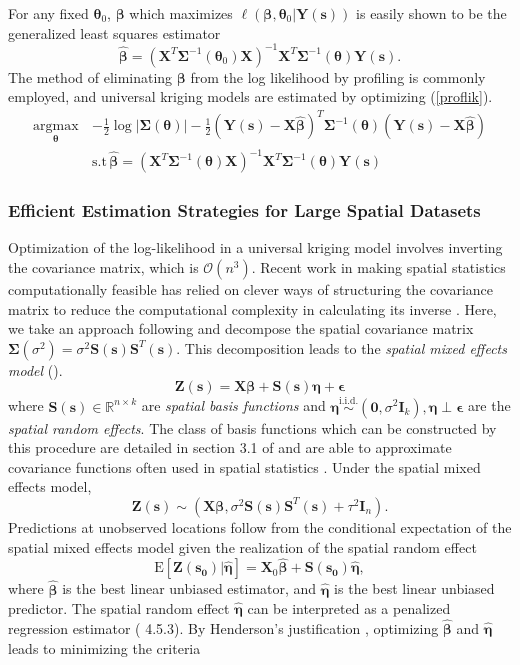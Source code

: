 \documentclass[12pt]{article}
\newcommand{\proc}{\mathbf{Y}(\mathbf{s})}
\newcommand{\covs}{\mathbf{X}}
\newcommand{\obs}{\mathbf{Z}(\mathbf{s})}
\newcommand{\nggt}{\boldsymbol{\epsilon}}
\newcommand{\eye}{\mathbf{I} }
\newcommand{\pars}{\boldsymbol{\theta}}
\newcommand{\Sig}{\boldsymbol{\Sigma}}
\newcommand{\re}{\boldsymbol{\eta}}
\newcommand{\estre}{\boldsymbol{\hat \eta}}
\newcommand{\spatbas}{\mathbf{S}(\mathbf{s})}
\newcommand{\tspatbas}{\mathbf{S}^T(\mathbf{s})}
\newcommand{\bbeta}{\boldsymbol{\beta}}
\begin{document}
For any fixed $\pars_0$, $ \bbeta$ which maximizes $\ell ( \bbeta,\pars_0 |\proc)$ is easily shown to be the generalized least squares estimator
$$ \boldsymbol {\hat \beta} = (\covs^T \Sig^{-1}(\pars_0) \covs )^{-1} \covs^T \Sig^{-1} (\pars) \proc.$$
The method of eliminating $\bbeta$ from the log likelihood by profiling is commonly employed, and universal kriging models are estimated by optimizing (\ref{proflik}). 
\begin{align}
\label{proflik}
\underset{ \pars}{\text{argmax} } \, &-\frac{1}{2} \log | \Sig(\pars) | - \frac{1}{2} (\proc - \covs \boldsymbol{ \hat \beta} )^T \Sig^{-1} (\pars) (\proc-\mathbf{ X} \boldsymbol{\hat\beta} ) \nonumber \\
& \text{s.t} \, \boldsymbol{ \hat \beta} = \left(\covs^T \Sig^{-1} (\pars)\mathbf{ X} \right)^{-1}\covs^T \Sig^{-1}(\pars) \proc
\end{align} 

\subsubsection{Efficient Estimation Strategies for Large Spatial Datasets}
\label{rankred}
Optimization of the log-likelihood in a universal kriging model involves inverting the covariance matrix, which is $\mathcal{O}(n^3)$. Recent work in making spatial statistics computationally feasible has relied on clever ways of structuring the covariance matrix to reduce the computational complexity in calculating its inverse \citep{banerjee2008gaussian,kaufman2008covariance}. Here, we take an approach following \cite{cressie2008} and decompose the spatial covariance matrix $\Sig (\sigma^2)= \sigma^2 \spatbas \tspatbas $.
This decomposition leads to the \textit{spatial mixed effects model} ().
\begin{equation}
\obs = \covs\bbeta + \spatbas \re + \nggt \label{slmm}
\end{equation}
where $\spatbas \in \mathbb{R}^{n \times k}$ are \textit{spatial basis functions} and $\re \overset{\text{i.i.d.}}{\sim} (\mathbf{0},\sigma^2 \eye_k), \re \perp \nggt$ are the \textit{spatial random effects}. The class of basis functions which can be constructed by this procedure are detailed in section 3.1 of \cite{cressie2008} and are able to approximate covariance functions often used in spatial statistics \citep{nychka2002multiresolution}. 
Under the spatial mixed effects model, 
$$\obs \sim (\covs \bbeta , \sigma^2 \spatbas \tspatbas + \tau^2 \eye_n).$$ 
Predictions at unobserved locations follow from the  conditional expectation of the spatial mixed effects model given the realization of the spatial random effect 
$$\text{E}[\mathbf{Z(s_0)} | \estre ] = \covs_0 \boldsymbol{\hat \beta} + \mathbf{S(s_0)} \estre , $$
where $\boldsymbol{\hat \beta}$ is the best linear unbiased estimator, and $\estre$ is the best linear unbiased predictor.
The spatial random effect $\estre$ can be interpreted as a penalized regression estimator (\cite{ruppert2003semiparametric} 4.5.3). By Henderson's justification \citep{robinson1991blup}, optimizing $ \boldsymbol{\hat \beta}$ and $\estre$ leads to minimizing the criteria
\end{document}
